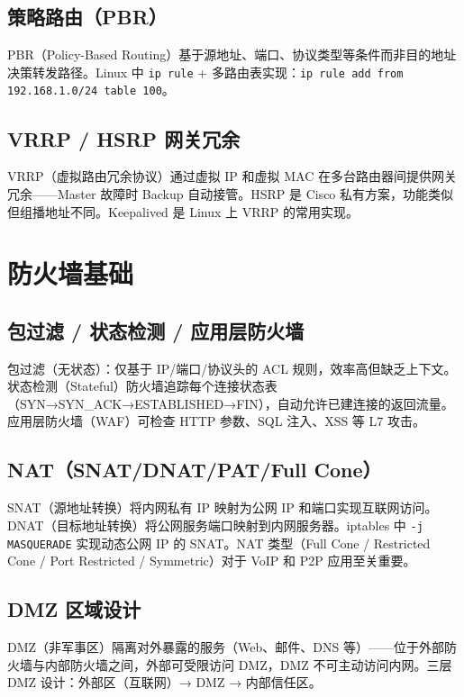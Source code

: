 \documentclass[12pt,UTF8]{ctexbook}
\begin{document}
    \subsection{策略路由（PBR）}

PBR（Policy-Based Routing）基于源地址、端口、协议类型等条件而非目的地址决策转发路径。Linux 中 \verb|ip rule| + 多路由表实现：\verb|ip rule add from 192.168.1.0/24 table 100|。

    \subsection{VRRP / HSRP 网关冗余}

VRRP（虚拟路由冗余协议）通过虚拟 IP 和虚拟 MAC 在多台路由器间提供网关冗余——Master 故障时 Backup 自动接管。HSRP 是 Cisco 私有方案，功能类似但组播地址不同。Keepalived 是 Linux 上 VRRP 的常用实现。

  \section{防火墙基础}
    \subsection{包过滤 / 状态检测 / 应用层防火墙}

包过滤（无状态）：仅基于 IP/端口/协议头的 ACL 规则，效率高但缺乏上下文。状态检测（Stateful）防火墙追踪每个连接状态表（SYN→SYN\_ACK→ESTABLISHED→FIN），自动允许已建连接的返回流量。应用层防火墙（WAF）可检查 HTTP 参数、SQL 注入、XSS 等 L7 攻击。

    \subsection{NAT（SNAT/DNAT/PAT/Full Cone）}

SNAT（源地址转换）将内网私有 IP 映射为公网 IP 和端口实现互联网访问。DNAT（目标地址转换）将公网服务端口映射到内网服务器。iptables 中 \verb|-j MASQUERADE| 实现动态公网 IP 的 SNAT。NAT 类型（Full Cone / Restricted Cone / Port Restricted / Symmetric）对于 VoIP 和 P2P 应用至关重要。

    \subsection{DMZ 区域设计}

DMZ（非军事区）隔离对外暴露的服务（Web、邮件、DNS 等）——位于外部防火墙与内部防火墙之间，外部可受限访问 DMZ，DMZ 不可主动访问内网。三层 DMZ 设计：外部区（互联网）→ DMZ → 内部信任区。
\end{document}
